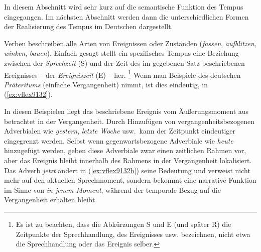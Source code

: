 \label{sec:tempus}

In diesem Abschnitt wird sehr kurz auf die semantische Funktion des Tempus eingegangen.
Im nächsten Abschnitt werden dann die unterschiedlichen Formen der Realisierung des Tempus im Deutschen dargestellt.

Verben beschreiben alle Arten von Ereignissen oder Zuständen (\textit{fassen}, \textit{aufblitzen}, \textit{winken}, \textit{bauen}).
Einfach gesagt stellt ein spezifisches Tempus eine Beziehung zwischen der \textit{Sprechzeit} (S) und der Zeit des im gegebenen Satz beschriebenen Ereignisses -- der \textit{Ereigniszeit} (E) -- her.%
\footnote{Es ist zu beachten, dass die Abkürzungen S und E (und später R) die Zeitpunkte der Sprechhandlung, des Ereignisses usw. bezeichnen, nicht etwa die Sprechhandlung oder das Ereignis selber.}
Wenn man Beispiele des deutschen \textit{Präteritums} (einfache Vergangenheit) nimmt, ist dies eindeutig, \zB in (\ref{ex:vflex9132}).

\begin{exe}
  \ex\label{ex:vflex9132}
  \begin{xlist}
  \end{xlist}
\end{exe}

In diesen Beispielen liegt das beschriebene Ereignis vom Äußerungsmoment aus betrachtet in der Vergangenheit.
Durch Hinzufügen von vergangenheitsbezogenen Adverbialen wie \textit{gestern}, \textit{letzte Woche} usw.\ kann der Zeitpunkt eindeutiger eingegrenzt werden.
Selbst wenn gegenwartsbezogene Adverbiale wie \textit{heute} hinzugefügt werden, geben diese Adverbiale zwar einen zeitlichen Rahmen vor, aber das Ereignis bleibt innerhalb des Rahmens in der Vergangenheit lokalisiert.
Das Adverb \textit{jetzt} ändert in (\ref{ex:vflex9132b}) seine Bedeutung und verweist nicht mehr auf den aktuellen Sprechmoment, sondern bekommt eine narrative Funktion im Sinne von \textit{in jenem Moment}, während der temporale Bezug auf die Vergangenheit erhalten bleibt.

\begin{exe}
  \ex\begin{xlist}
  \end{xlist}
\end{exe}


